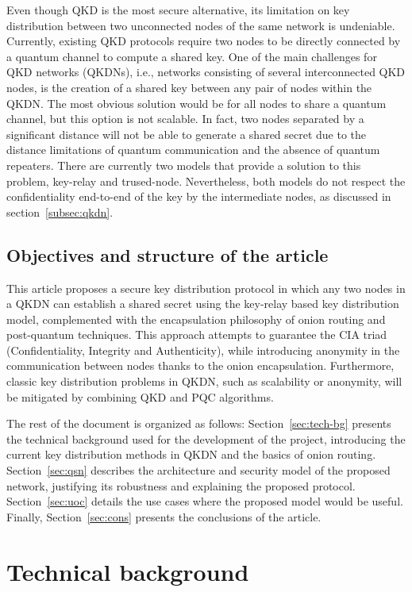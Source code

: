 \documentclass[conference]{IEEEtran}
\begin{document}
Even though QKD is the most secure alternative, its limitation on key distribution between two unconnected nodes of the same network is undeniable. Currently, existing QKD protocols require two nodes to be directly connected by a quantum channel to compute a shared key. One of the main challenges for QKD networks (QKDNs), i.e., networks consisting of several interconnected QKD nodes, is the creation of a shared key between any pair of nodes within the QKDN. The most obvious solution would be for all nodes to share a quantum channel, but this option is not scalable. In fact, two nodes separated by a significant distance will not be able to generate a shared secret due to the distance limitations of quantum communication and the absence of quantum repeaters. There are currently two models that provide a solution to this problem, key-relay and trused-node. Nevertheless, both models do not respect the confidentiality end-to-end of the key by the intermediate nodes, as discussed in section~\ref{subsec:qkdn}.

\subsection{Objectives and structure of the article}

This article proposes a secure key distribution protocol in which any two nodes in a QKDN can establish a shared secret using the key-relay based key distribution model, complemented with the encapsulation philosophy of onion routing and post-quantum techniques. This approach attempts to guarantee the CIA triad (Confidentiality, Integrity and Authenticity), while introducing anonymity in the communication between nodes thanks to the onion encapsulation. Furthermore, classic key distribution problems in QKDN, such as scalability or anonymity, will be mitigated by combining QKD and PQC algorithms.

The rest of the document is organized as follows: Section~\ref{sec:tech-bg} presents 
the technical background used for the development of the project, introducing the 
current key distribution methods in QKDN and the basics of onion routing. Section~\ref{sec:qsn} describes the architecture and security model of the proposed network, justifying its robustness and explaining the proposed protocol. Section~\ref{sec:uoc}
details the use cases where the proposed model would be useful. Finally, Section~\ref{sec:cons} presents the conclusions of the article.

\section{Technical background \label{sec:tech-bg}}
\end{document}
